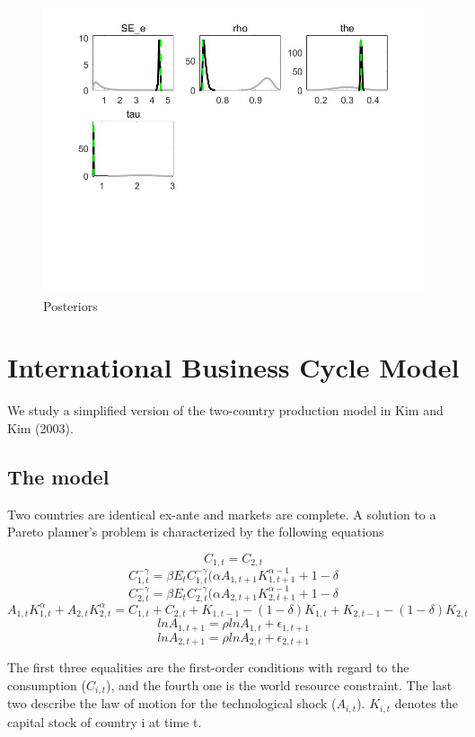 \documentclass[a4paper,12pt]{scrartcl} %
\begin{document}
\begin{figure}[htbp!]
		\centering
			\includegraphics[width=0.8\linewidth]{fig3.jpg}
            \caption{Posteriors}\label{3}
\end{figure}


\section{International Business Cycle Model}

We study a simplified version of the two-country production model in Kim and Kim (2003).

\subsection{The model}

Two countries are identical ex-ante and markets are complete. A solution to a Pareto planner’s problem is characterized by the following equations

$$C_{1,t}=C_{2,t}$$
$$C_{1,t}^{-\gamma}=\beta E_tC_{1,t}^{-\gamma}(\alpha A_{1,t+1}K_{1,t+1}^{\alpha-1}+1-\delta$$
$$C_{2,t}^{-\gamma}=\beta E_tC_{2,t}^{-\gamma}(\alpha A_{2,t+1}K_{2,t+1}^{\alpha-1}+1-\delta$$
$$A_{1,t}K_{1,t}^{\alpha}+A_{2,t}K_{2,t}^{\alpha}=C_{1,t}+C_{2,t}+K_{1,t-1}-(1-\delta)K_{1,t}+K_{2,t-1}-(1-\delta)K_{2,t}$$
$$lnA_{1,t+1}=\rho lnA_{1,t}+\epsilon_{1,t+1}$$
$$lnA_{2,t+1}=\rho lnA_{2,t}+\epsilon_{2,t+1}$$

The first three equalities are the first-order conditions with regard to the consumption ($C_{i,t}$), and the fourth one is the world resource constraint. The last two describe the law of motion for the technological shock ($A_{i,t}$). $K_{i,t}$ denotes the capital stock of country i at time t.
\end{document}
